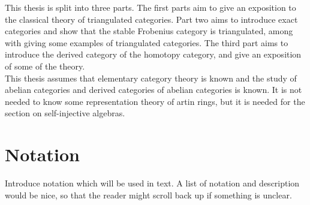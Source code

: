     This thesis is split into three parts. The first parts aim to give an exposition to the classical theory of triangulated categories. Part two aims to introduce exact categories and show that the stable Frobenius category is triangulated, among with giving some examples of triangulated categories. The third part aims to introduce the derived category of the homotopy category, and give an exposition of some of the theory. \\

    This thesis assumes that elementary category theory is known and the study of abelian categories and derived categories of abelian categories is known. It is not needed to know some representation theory of artin rings, but it is needed for the section on self-injective algebras.
        
    \section*{Notation}
        Introduce notation which will be used in text. A list of notation and description would be nice, so that the reader might scroll back up if something is unclear.

